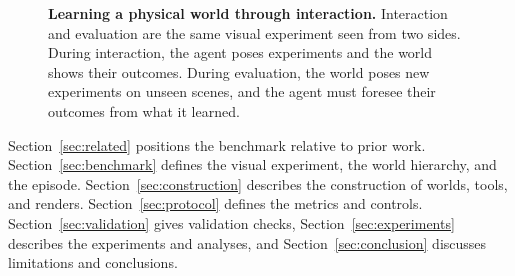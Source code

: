 \begin{figure}[t]
  \centering
  \caption{\textbf{Learning a physical world through interaction.} Interaction and evaluation are the same visual experiment seen from two sides. During interaction, the agent poses experiments and the world shows their outcomes. During evaluation, the world poses new experiments on unseen scenes, and the agent must foresee their outcomes from what it learned.}
  \label{fig:hero}
\end{figure}

Section~\ref{sec:related} positions the benchmark relative to prior work. Section~\ref{sec:benchmark} defines the visual experiment, the world hierarchy, and the episode. Section~\ref{sec:construction} describes the construction of worlds, tools, and renders. Section~\ref{sec:protocol} defines the metrics and controls. Section~\ref{sec:validation} gives validation checks, Section~\ref{sec:experiments} describes the experiments and analyses, and Section~\ref{sec:conclusion} discusses limitations and conclusions.
